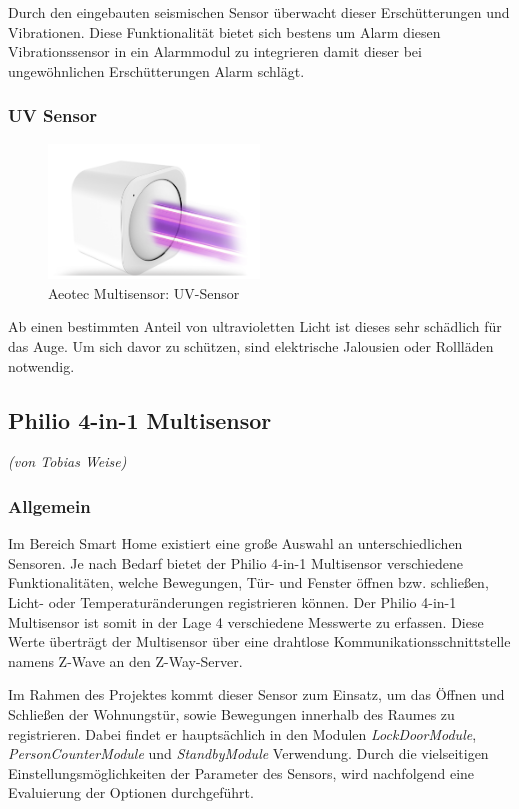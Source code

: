 Durch den eingebauten seismischen Sensor überwacht dieser Erschütterungen und Vibrationen. Diese Funktionalität bietet sich bestens um Alarm diesen Vibrationssensor in ein Alarmmodul zu integrieren damit dieser bei ungewöhnlichen Erschütterungen Alarm schlägt.

\subsubsection{UV Sensor}
\begin{figure}[h!]
	\centering
	\includegraphics[width=0.5\textwidth]{img/Sensorevaluation/AeoUV.png}
	\caption{Aeotec Multisensor: UV-Sensor}
	\label{fig:sensorenAeoUV}
\end{figure}

Ab einen bestimmten Anteil von ultravioletten Licht ist dieses sehr schädlich für das Auge. Um sich davor zu schützen, sind elektrische Jalousien oder Rollläden notwendig.


\newpage
\subsection{Philio 4-in-1 Multisensor}
\emph{(von Tobias Weise)}
\subsubsection{Allgemein}
Im Bereich Smart Home existiert eine große Auswahl an unterschiedlichen Sensoren. Je nach Bedarf bietet der Philio 4-in-1 Multisensor verschiedene Funktionalitäten, welche Bewegungen, Tür- und Fenster öffnen bzw. schließen, Licht- oder Temperaturänderungen registrieren können. Der Philio 4-in-1 Multisensor ist somit in der Lage 4 verschiedene Messwerte zu erfassen. Diese Werte überträgt der Multisensor über eine drahtlose Kommunikationsschnittstelle namens Z-Wave an den Z-Way-Server.

Im Rahmen des Projektes kommt dieser Sensor zum Einsatz, um das Öffnen und Schließen der Wohnungstür, sowie Bewegungen innerhalb des Raumes zu registrieren. Dabei findet er hauptsächlich in den Modulen \emph{LockDoorModule}, \emph{PersonCounterModule} und \emph{StandbyModule} Verwendung. Durch die vielseitigen Einstellungsmöglichkeiten der Parameter des Sensors, wird nachfolgend eine Evaluierung der Optionen durchgeführt.

